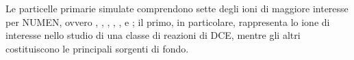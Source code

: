 Le particelle primarie simulate comprendono sette degli ioni di maggiore interesse per NUMEN, ovvero , , , , ,  e ; il primo, in particolare, rappresenta lo ione di interesse nello studio di una classe di reazioni di DCE, mentre gli altri costituiscono le principali sorgenti di fondo.







